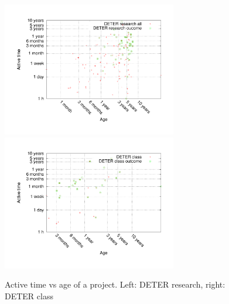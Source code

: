 \documentclass[10pt, twocolumn]{article} %
\begin{document}
\begin{figure}[htbp] \begin{center} \includegraphics[width=3in,
type=pdf,ext=.pdf,read=.pdf]{figs/proj.agevsactive.res.gnu}
\includegraphics[width=3in,
type=pdf,ext=.pdf,read=.pdf]{figs/proj.agevsactivecl.gnu}
\caption{Active time vs age of a project. Left: DETER research, right:
DETER class} \label{projagevsactive} \end{center} \end{figure}
\end{document}
